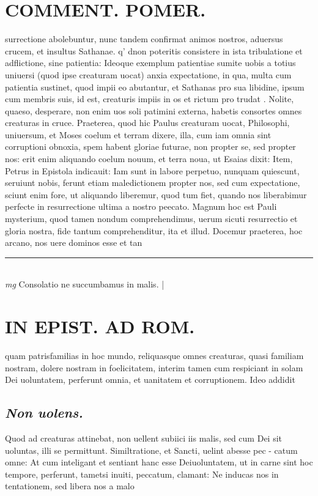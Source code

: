 \documentclass{article}
\begin{document}
\begin{pages}
\section*{COMMENT. POMER.  }\pstart surrectione abolebuntur, nunc tandem confirmat animos nostros, aduersus crucem, et insultus Sathanae.  q' dnon poteritis consistere in ista tribulatione et adflictione, sine patientia: Ideoque exemplum patientiae sumite uobis a totius uniuersi (quod ipse creaturam uocat) anxia expectatione, in qua, multa cum patientia sustinet, quod impii eo abutantur, et Sathanas pro sua libidine, ipsum cum membris suis, id est, creaturis impiis in os et rictum pro trudat . Nolite, quaeso, desperare, non enim uos soli patimini externa, habetis consortes omnes creaturas in cruce. Praeterea, quod hic Paulus creaturam uocat, Philosophi, uniuersum, et Moses coelum et terram dixere, illa, cum iam omnia sint corruptioni obnoxia, spem habent gloriae futurae, non propter se, sed propter nos: erit enim aliquando coelum nouum, et terra noua, ut Esaias dixit: Item, Petrus in Epistola indicauit: Iam sunt in labore perpetuo, nunquam quiescunt, seruiunt nobis, ferunt etiam maledictionem propter nos, sed cum expectatione, sciunt enim fore, ut aliquando liberemur, quod tum fiet, quando nos liberabimur perfecte in resurrectione ultima a nostro peecato. Magnum hoc est Pauli mysterium, quod tamen nondum comprehendimus, uerum sicuti resurrectio et gloria nostra, fide tantum comprehenditur, ita et illud. Docemur praeterea, hoc arcano, nos uere dominos esse et tan\pend
\vspace{0.5cm}\noindent
\vspace{0.2cm}\rule{1cm}{0.2pt}\\ 
\hspace{0.2cm}\textit{mg}
\footnotesize Consolatio ne succumbamus in malis. 
\normalsize| 
\section*{IN EPIST. AD ROM.  }
\marginpar{[ p.94 ]}\pstart quam patrisfamilias in hoc mundo, reliquasque omnes creaturas, quasi familiam nostram, dolere nostram in foelicitatem, interim tamen cum respiciant in solam Dei uoluntatem, perferunt omnia, et uanitatem et corruptionem. Ideo addidit  \pend
{}
{}
\subsection*{\textit{Non uolens. }}\pstart Quod ad creaturas attinebat, non uellent subiici iis malis, sed cum Dei sit uoluntas, illi se permittunt. Similtratione, et Sancti, uelint abesse pec - catum omne: At cum inteligant et sentiant hanc esse Deiuoluntatem, ut in carne sint hoc tempore, perferunt, tametsi inuiti, peccatum, clamant: Ne inducas nos in tentationem, sed libera nos a malo\pend
{}
{}

\end{pages}
\end{document}
